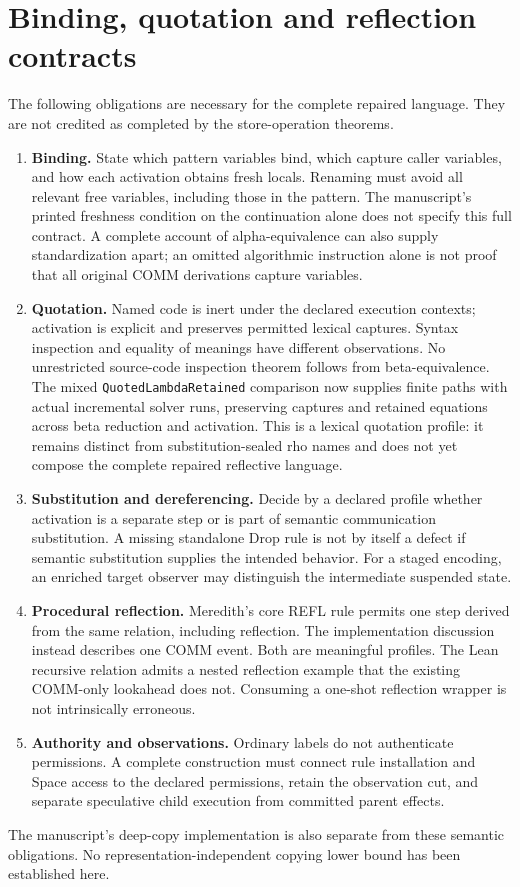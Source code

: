 \documentclass[11pt]{article}
\newcommand{\code}[1]{\texttt{\small #1}}
\begin{document}
\section{Binding, quotation and reflection contracts}

The following obligations are necessary for the complete repaired language.
They are not credited as completed by the store-operation theorems.
\begin{enumerate}
\item \textbf{Binding.} State which pattern variables bind, which capture
caller variables, and how each activation obtains fresh locals. Renaming
must avoid all relevant free variables, including those in the pattern.
The manuscript's printed freshness condition on the continuation alone
does not specify this full contract. A complete account of alpha-equivalence
can also supply standardization apart; an omitted algorithmic instruction
alone is not proof that all original COMM derivations capture variables.
\item \textbf{Quotation.} Named code is inert under the declared execution
contexts; activation is explicit and preserves permitted lexical captures.
Syntax inspection and equality of meanings have different observations.
No unrestricted source-code inspection theorem follows from beta-equivalence.
The mixed \code{QuotedLambdaRetained} comparison now supplies finite paths
with actual incremental solver runs, preserving captures and retained
equations across beta reduction and activation. This is a lexical quotation
profile: it remains distinct from substitution-sealed rho names and does
not yet compose the complete repaired reflective language.
\item \textbf{Substitution and dereferencing.} Decide by a declared profile
whether activation is a separate step or is part of semantic communication
substitution. A missing standalone Drop rule is not by itself a defect if
semantic substitution supplies the intended behavior. For a staged encoding,
an enriched target observer may distinguish the intermediate suspended state.
\item \textbf{Procedural reflection.} Meredith's core REFL rule permits
one step derived from the same relation, including reflection. The
implementation discussion instead describes one COMM event. Both are
meaningful profiles. The Lean recursive relation admits a nested reflection
example that the existing COMM-only lookahead does not. Consuming a one-shot
reflection wrapper is not intrinsically erroneous.
\item \textbf{Authority and observations.} Ordinary labels do not authenticate
permissions. A complete construction must connect rule installation and
Space access to the declared permissions, retain the observation cut, and
separate speculative child execution from committed parent effects.
\end{enumerate}
The manuscript's deep-copy implementation is also separate from these
semantic obligations. No representation-independent copying lower bound
has been established here.
\end{document}
